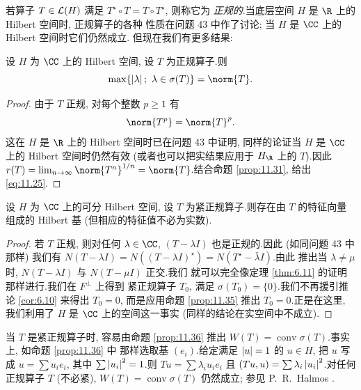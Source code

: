 若算子 $T\in\mathcal{L}(H)$ 满足 $T^\star\circ T=T\circ T^\star$, 则称它为
\emph{正规的}.当底层空间 $H$ 是 $\R$ 上的 Hilbert 空间时, 正规算子的各种
性质在问题 43 中作了讨论; 当 $H$ 是 $\CC$ 上的 Hilbert 空间时它们仍然成立.
但现在我们有更多结果:

\begin{proposition}
\label{prop:11.35}
设 $H$ 为 $\CC$ 上的 Hilbert 空间, 设 $T$ 为正规算子.则
\begin{equation}
\max\{\abs{\lambda};\ \lambda\in\sigma(T)\}=\norm{T}.
\label{eq:11.25}
\end{equation}
\end{proposition}

\begin{proof}
由于 $T$ 正规, 对每个整数 $p\ge1$ 有
\begin{equation*}
\norm{T^p}=\norm{T}^p.
\end{equation*}
这在 $H$ 是 $\R$ 上的 Hilbert 空间时已在问题 43 中证明, 同样的论证当 $H$
是 $\CC$ 上的 Hilbert 空间时仍然有效 (或者也可以把实结果应用于 $H_\R$ 上的
$T$).因此 $r(T)=\lim_{n\to\infty}\norm{T^n}^{1/n}=\norm{T}$.结合命题
 \ref{prop:11.31}, 给出 \eqref{eq:11.25}.
\end{proof}

\begin{proposition}
\label{prop:11.36}
设 $H$ 为 $\CC$ 上的可分 Hilbert 空间, 设 $T$ 为紧正规算子.则存在由 $T$
的特征向量组成的 Hilbert 基 (但相应的特征值不必为实数).
\end{proposition}

\begin{proof}
若 $T$ 正规, 则对任何 $\lambda\in\CC$, $(T-\lambda I)$ 也是正规的.因此
(如同问题 43 中那样) 我们有
$N(T-\lambda I)=N((T-\lambda I)^\star)=N(T^\star-\bar\lambda I)$.由此
推出当 $\lambda\ne\mu$ 时, $N(T-\lambda I)$ 与 $N(T-\mu I)$ 正交.我们
就可以完全像定理  \ref{thm:6.11} 的证明那样进行.我们在 $F^\perp$ 上得到
紧正规算子 $T_0$, 满足 $\sigma(T_0)=\{0\}$.我们不再援引推论  \ref{cor:6.10}
来得出 $T_0=0$, 而是应用命题  \ref{prop:11.35} 推出 $T_0=0$.正是在这里,
我们利用了 $H$ 是 $\CC$ 上的空间这一事实 (同样的结论在实空间中不成立).
\end{proof}

\begin{remark}
\label{rem:11.2}
当 $T$ 是紧正规算子时, 容易由命题  \ref{prop:11.36} 推出
$W(T)=\operatorname{conv}\sigma(T)$.事实上, 如命题  \ref{prop:11.36} 中
那样选取基 $(e_i)$.给定满足 $\left|u\right|=1$ 的 $u\in H$, 把 $u$ 写成
$u=\sum u_ie_i$, 其中 $\sum\left|u_i\right|^2=1$.则 $Tu=\sum\lambda_iu_ie_i$ 且
$(Tu,u)=\sum\lambda_i\left|u_i\right|^2$.对任何正规算子 $T$ (不必紧),
$W(T)=\operatorname{conv}\sigma(T)$ 仍然成立; 参见 P.~R.~Halmos .
\end{remark}


